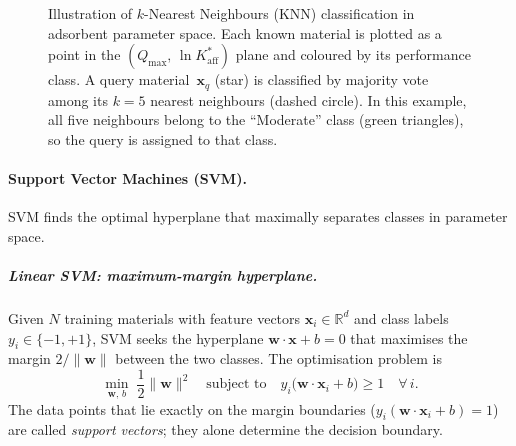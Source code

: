 \documentclass[12pt]{article}
\begin{document}
\begin{figure}[H]
		\caption{Illustration of $k$-Nearest Neighbours (KNN)
			classification in adsorbent parameter space.
			Each known material is plotted as a point in the
			$(Q_{\max},\, \ln K_{\mathrm{aff}}^{\ast})$ plane and
			coloured by its performance class.
			A query material~$\mathbf{x}_q$ (star) is classified by
			majority vote among its $k = 5$ nearest neighbours
			(dashed circle).  In this example, all five neighbours
			belong to the ``Moderate'' class (green triangles), so
			the query is assigned to that class.}
		\label{fig:KNN_illustration}
	\end{figure}

	\paragraph{Support Vector Machines (SVM).}
	SVM finds the optimal hyperplane that maximally separates classes
	in parameter space.

	\subparagraph{Linear SVM: maximum-margin hyperplane.}
	Given $N$ training materials with feature vectors
	$\mathbf{x}_i \in \mathbb{R}^d$ and class labels
	$y_i \in \{-1,+1\}$, SVM seeks the hyperplane
	$\mathbf{w}\cdot\mathbf{x} + b = 0$ that maximises the margin
	$2/\|\mathbf{w}\|$ between the two classes.
	The optimisation problem is
	\begin{equation}
		\min_{\mathbf{w},\,b}\;
		\frac{1}{2}\|\mathbf{w}\|^2
		\quad\text{subject to}\quad
		y_i\bigl(\mathbf{w}\cdot\mathbf{x}_i + b\bigr) \ge 1
		\quad \forall\, i.
		\label{eq:SVM_hard}
	\end{equation}
	The data points that lie exactly on the margin boundaries
	($y_i(\mathbf{w}\cdot\mathbf{x}_i + b) = 1$) are called
	\emph{support vectors}; they alone determine the decision
	boundary.
\end{document}
